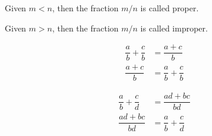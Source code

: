 \documentclass[20150903-160354-rs2.2-MarksMathNotebook.tex]{subfiles}
\begin{document}
\begin{definition}

Given $m<n$, then the fraction $m/n$ is called \alert{proper}.

\end{definition}

\begin{definition}

Given $m>n$, then the fraction $m/n$ is called \alert{improper}.

\end{definition}

\begin{definition}
\begin{subequations}
\begin{align}
\dfrac{a}{b} + \dfrac{c}{b} &= \dfrac{a+c}{b} \label{eq:cd1} \\
\dfrac{a+c}{b}&= \dfrac{a}{b} + \dfrac{c}{b} \label{eq:cd2}
\end{align}
\end{subequations}
\end{definition}

\begin{arule}
\begin{subequations}
\begin{align}
\dfrac{a}{b} + \dfrac{c}{d} &= \dfrac{ad+bc}{bd} \label{eq:fooa1} \\
\dfrac{ad+bc}{bd} &= \dfrac{a}{b} + \dfrac{c}{d} \label{eq:fooa2}
\end{align}
\end{subequations}
\end{arule}
\end{document}
